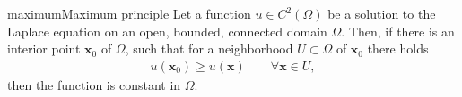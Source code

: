 \begin{Theorem*}{maximum}{Maximum principle}
  Let a function $u\in C^2(\Omega)$ be a solution to the Laplace
  equation on an open, bounded, connected domain $\Omega$. Then, if
  there is an interior point $\mathbf x_0$ of $\Omega$, such that for
  a neighborhood $U\subset\Omega$ of $\mathbf x_0$ there holds
  \begin{gather*}
    u(\mathbf x_0) \ge u(\mathbf x) \qquad \forall \mathbf x\in U,
  \end{gather*}
  then the function is constant in $\Omega$.
\end{Theorem*}

